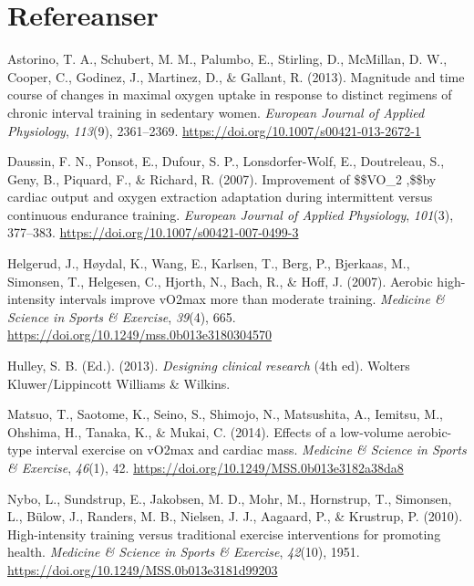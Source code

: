 \documentclass[
  letterpaper,
  DIV=11,
  numbers=noendperiod]{scrartcl}
\newlength{\cslhangindent}
\newlength{\cslentryspacingunit} %
\newenvironment{CSLReferences}[2] %
 {%
  \setlength{\parindent}{0pt}
  \ifodd #1
  \let\oldpar\par
  \def\par{\hangindent=\cslhangindent\oldpar}
  \fi
  \setlength{\parskip}{#2\cslentryspacingunit}
 }%
 {}
\begin{document}
\newpage

\hypertarget{refereanser}{%
\section*{Refereanser}\label{refereanser}}

\hypertarget{refs}{}
\begin{CSLReferences}{1}{0}
\leavevmode{}%
Astorino, T. A., Schubert, M. M., Palumbo, E., Stirling, D., McMillan,
D. W., Cooper, C., Godinez, J., Martinez, D., \& Gallant, R. (2013).
Magnitude and time course of changes in maximal oxygen uptake in
response to distinct regimens of chronic interval training in sedentary
women. \emph{European Journal of Applied Physiology}, \emph{113}(9),
2361--2369. \url{https://doi.org/10.1007/s00421-013-2672-1}

\leavevmode{}%
Daussin, F. N., Ponsot, E., Dufour, S. P., Lonsdorfer-Wolf, E.,
Doutreleau, S., Geny, B., Piquard, F., \& Richard, R. (2007).
Improvement of
{\$}{\$}\dot{\textbraceleft}V{\textbraceright}\hbox{\textbraceleft}O{\textbraceright}{\_}{\textbraceleft}2
\max{\textbraceright},{\$}{\$}by cardiac output and oxygen extraction
adaptation during intermittent versus continuous endurance training.
\emph{European Journal of Applied Physiology}, \emph{101}(3), 377--383.
\url{https://doi.org/10.1007/s00421-007-0499-3}

\leavevmode{}%
Helgerud, J., Høydal, K., Wang, E., Karlsen, T., Berg, P., Bjerkaas, M.,
Simonsen, T., Helgesen, C., Hjorth, N., Bach, R., \& Hoff, J. (2007).
Aerobic high-intensity intervals improve v{\textperiodcentered}O2max
more than moderate training. \emph{Medicine \& Science in Sports \&
Exercise}, \emph{39}(4), 665.
\url{https://doi.org/10.1249/mss.0b013e3180304570}

\leavevmode{}%
Hulley, S. B. (Ed.). (2013). \emph{Designing clinical research} (4th
ed). Wolters Kluwer/Lippincott Williams \& Wilkins.

\leavevmode{}%
Matsuo, T., Saotome, K., Seino, S., Shimojo, N., Matsushita, A.,
Iemitsu, M., Ohshima, H., Tanaka, K., \& Mukai, C. (2014). Effects of a
low-volume aerobic-type interval exercise on v{\textperiodcentered}O2max
and cardiac mass. \emph{Medicine \& Science in Sports \& Exercise},
\emph{46}(1), 42. \url{https://doi.org/10.1249/MSS.0b013e3182a38da8}

\leavevmode{}%
Nybo, L., Sundstrup, E., Jakobsen, M. D., Mohr, M., Hornstrup, T.,
Simonsen, L., Bülow, J., Randers, M. B., Nielsen, J. J., Aagaard, P., \&
Krustrup, P. (2010). High-intensity training versus traditional exercise
interventions for promoting health. \emph{Medicine \& Science in Sports
\& Exercise}, \emph{42}(10), 1951.
\url{https://doi.org/10.1249/MSS.0b013e3181d99203}

\end{CSLReferences}
\end{document}
